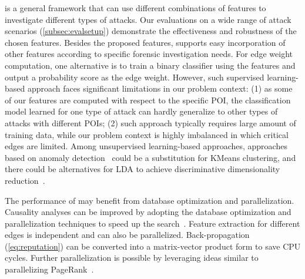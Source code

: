 \tool is a general framework that can use different combinations of features to investigate different types of attacks.
Our evaluations on a wide range of attack scenarios (\cref{subsec:evalsetup}) demonstrate the effectiveness and robustness of the chosen features.
Besides the proposed features, \tool supports easy incorporation of other features according to specific forensic investigation needs.
For edge weight computation, one alternative is to train a binary classifier using the features and output a probability score as the edge weight.
However, such supervised learning-based approach faces significant limitations in our problem context:
(1) as some of our features are computed with respect to the specific POI, the classification model learned for one type of attack can hardly generalize to other types of attacks with different POIs;
(2) such approach typically requires large amount of training data, while our problem context is highly imbalanced in which critical edges are limited. 
%
Among unsupervised learning-based approaches, approaches based on anomaly detection~\cite{anomalysurvey} could be a substitution for KMeans clustering, and there could be alternatives for LDA to achieve discriminative dimensionality reduction~\cite{Mika99fisherdiscriminant,sugiyama2006local}.



The performance of \tool may benefit from database optimization and parallelization. 
Causality analyses can be improved by adopting the database optimization and parallelization techniques to speed up the search~\cite{gao2018aiql,gao2018saql}.
Feature extraction for different edges is independent and can also be parallelized.
Back-propagation (\cref{eq:reputation}) can be converted into a matrix-vector product form to save CPU cycles.
Further parallelization is possible by leveraging ideas similar to parallelizing PageRank~\cite{gleich2004fast,kohlschutter2006efficient}. 


